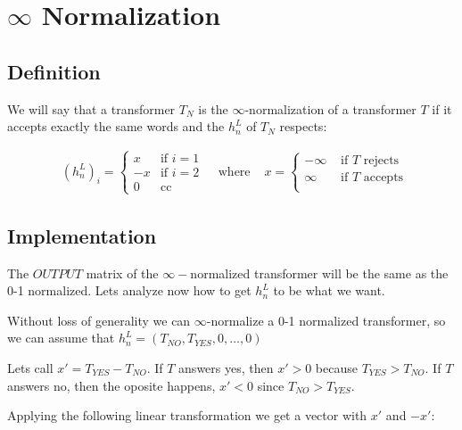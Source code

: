 \section*{$\infty$ Normalization}

\subsection*{Definition}

We will say that a transformer $T_N$ is the $\infty$-normalization of a transformer $T$ if it accepts exactly the same words and the $h_n^L$ of $T_N$ respects:


\begin{align*}
    & (h_n^L)_i =
    \begin{cases}
    x & \text{if } i = 1 \\
    -x & \text{if } i = 2 \\
    0 & \text{cc }
    \end{cases} 
    & \text{ where }
    & x = 
    \begin{cases}
    -\infty & \text{ if $T$ rejects }  \\
    \infty & \text{ if $T$ accepts } \\
    \end{cases} 
\end{align*}


\subsection*{Implementation}

The $OUTPUT$ matrix of the $\infty-$normalized transformer will be the same as the 0-1 normalized. Lets analyze now how to get $h_n^L$ to be what we want.

Without loss of generality we can $\infty$-normalize a 0-1 normalized transformer, so we can assume that $h_n^L = (T_{NO}, T_{YES}, 0, \dots, 0)$

Lets call $x' = T_{YES} - T_{NO}$. If $T$ answers yes, then $x' > 0$ because $T_{YES} > T_{NO}$. If $T$ answers no, then the oposite happens, $x' < 0$ since $T_{NO} > T_{YES}$.

Applying the following linear transformation we get a vector with $x'$ and $-x'$:

